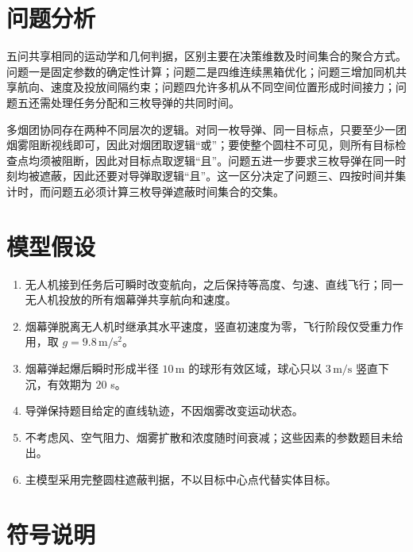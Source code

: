 \documentclass[12pt,a4paper]{article}
\begin{document}
\section{问题分析}

五问共享相同的运动学和几何判据，区别主要在决策维数及时间集合的聚合方式。问题一是固定参数的确定性计算；问题二是四维连续黑箱优化；问题三增加同机共享航向、速度及投放间隔约束；问题四允许多机从不同空间位置形成时间接力；问题五还需处理任务分配和三枚导弹的共同时间。

多烟团协同存在两种不同层次的逻辑。对同一枚导弹、同一目标点，只要至少一团烟雾阻断视线即可，因此对烟团取逻辑“或”；要使整个圆柱不可见，则所有目标检查点均须被阻断，因此对目标点取逻辑“且”。问题五进一步要求三枚导弹在同一时刻均被遮蔽，因此还要对导弹取逻辑“且”。这一区分决定了问题三、四按时间并集计时，而问题五必须计算三枚导弹遮蔽时间集合的交集。

\section{模型假设}

\begin{enumerate}[label=(\arabic*)]
\item 无人机接到任务后可瞬时改变航向，之后保持等高度、匀速、直线飞行；同一无人机投放的所有烟幕弹共享航向和速度。
\item 烟幕弹脱离无人机时继承其水平速度，竖直初速度为零，飞行阶段仅受重力作用，取 $g=9.8\,\mathrm{m/s^2}$。
\item 烟幕弹起爆后瞬时形成半径 $10\,\mathrm{m}$ 的球形有效区域，球心只以 $3\,\mathrm{m/s}$ 竖直下沉，有效期为 $20$ s。
\item 导弹保持题目给定的直线轨迹，不因烟雾改变运动状态。
\item 不考虑风、空气阻力、烟雾扩散和浓度随时间衰减；这些因素的参数题目未给出。
\item 主模型采用完整圆柱遮蔽判据，不以目标中心点代替实体目标。
\end{enumerate}

\section{符号说明}
\end{document}
